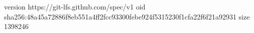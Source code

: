 version https://git-lfs.github.com/spec/v1
oid sha256:48a45a72886f8eb551a4ff2fcc93300febe924f5315230f1cfa22f6f21a92931
size 1398246
